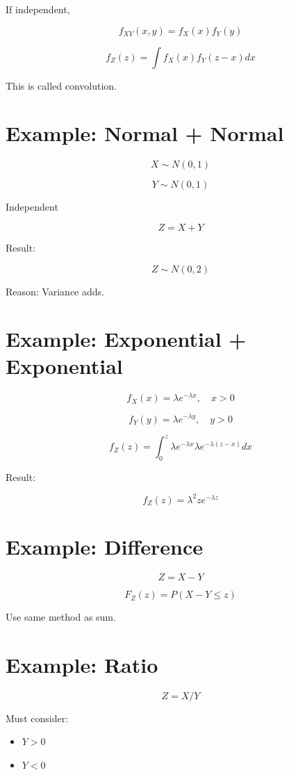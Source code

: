 \documentclass[12pt]{article}
\begin{document}
If independent,

\[
f_{XY}(x,y)
=
f_X(x) f_Y(y)
\]

\[
f_Z(z)
=
\int
f_X(x) f_Y(z-x)
dx
\]

This is called convolution.

\section{Example: Normal + Normal}

\[
X \sim N(0,1)
\]

\[
Y \sim N(0,1)
\]

Independent

\[
Z = X + Y
\]

Result:

\[
Z \sim N(0,2)
\]

Reason:
Variance adds.

\section{Example: Exponential + Exponential}

\[
f_X(x) = \lambda e^{-\lambda x}, \quad x>0
\]

\[
f_Y(y) = \lambda e^{-\lambda y}, \quad y>0
\]

\[
f_Z(z)
=
\int_0^z
\lambda e^{-\lambda x}
\lambda e^{-\lambda(z-x)}
dx
\]

Result:

\[
f_Z(z)
=
\lambda^2 z e^{-\lambda z}
\]

\section{Example: Difference}

\[
Z = X - Y
\]

\[
F_Z(z) = P(X - Y \le z)
\]

Use same method as sum.

\section{Example: Ratio}

\[
Z = X/Y
\]

Must consider:

\begin{itemize}
\item $Y > 0$
\item $Y < 0$
\end{itemize}
\end{document}
